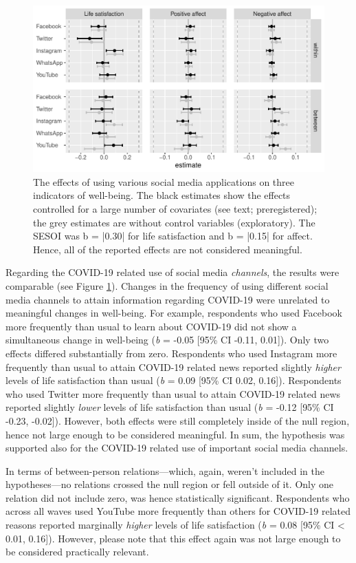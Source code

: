 \documentclass[
  english,
  man,floatsintext]{apa6}
\begin{document}
\begin{figure}
\includegraphics[width=\textwidth]{figures/fig_results_channel} \caption{The effects of using various social media applications on three indicators of well-being. The black estimates show the effects controlled for a large number of covariates (see text; preregistered); the grey estimates are without control variables (exploratory). The SESOI was b = |0.30| for life satisfaction and b = |0.15| for affect. Hence, all of the reported effects are not considered meaningful.}\label{fig:res-channels}
\end{figure}

Regarding the COVID-19 related use of social media \emph{channels}, the results were comparable (see Figure \ref{fig:res-channels}).
Changes in the frequency of using different social media channels to attain information regarding COVID-19 were unrelated to meaningful changes in well-being.
For example, respondents who used Facebook more frequently than usual to learn about COVID-19 did not show a simultaneous change in well-being (\emph{b} = -0.05 {[}95\% CI -0.11, 0.01{]}).
Only two effects differed substantially from zero.
Respondents who used Instagram more frequently than usual to attain COVID-19 related news reported slightly \emph{higher} levels of life satisfaction than usual (\emph{b} = 0.09 {[}95\% CI 0.02, 0.16{]}).
Respondents who used Twitter more frequently than usual to attain COVID-19 related news reported slightly \emph{lower} levels of life satisfaction than usual (\emph{b} = -0.12 {[}95\% CI -0.23, -0.02{]}).
However, both effects were still completely inside of the null region, hence not large enough to be considered meaningful.
In sum, the hypothesis was supported also for the COVID-19 related use of important social media channels.

In terms of between-person relations---which, again, weren't included in the hypotheses---no relations crossed the null region or fell outside of it.
Only one relation did not include zero, was hence statistically significant.
Respondents who across all waves used YouTube more frequently than others for COVID-19 related reasons reported marginally \emph{higher} levels of life satisfaction (\emph{b} = 0.08 {[}95\% CI \textless{} 0.01, 0.16{]}).
However, please note that this effect again was not large enough to be considered practically relevant.
\end{document}
